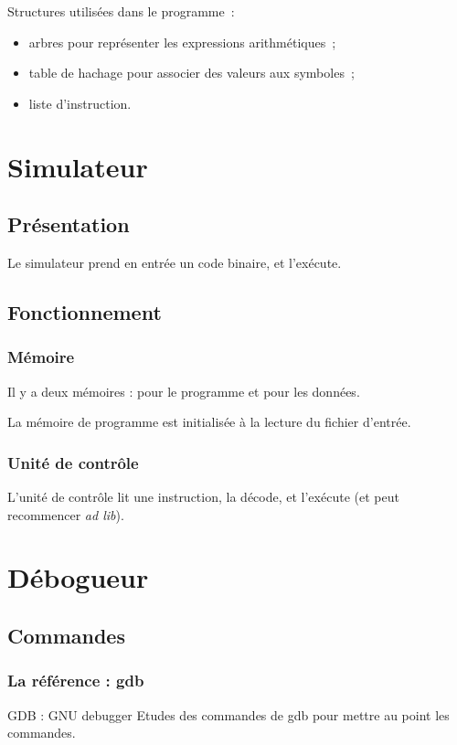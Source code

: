 \documentclass{beamer}
\begin{document}
\begin{frame}
Structures utilisées dans le programme~:
\begin{itemize}
\item arbres pour représenter les expressions arithmétiques~;
\item table de hachage pour associer des valeurs aux symboles~;
\item liste d'instruction.
\end{itemize}
\end{frame}

\section{Simulateur}
\subsection{Présentation}
\begin{frame}
Le simulateur prend en entrée un code binaire, et l'exécute.
\end{frame}

\subsection{Fonctionnement}
\begin{frame}
\frametitle{Mémoire}
	Il y a deux mémoires : pour le programme et pour les données.
	
	La mémoire de programme est initialisée à la lecture du fichier d'entrée.
\end{frame}

\begin{frame}
\frametitle{Unité de contrôle}
L'unité de contrôle lit une instruction, la décode, et l'exécute (et peut recommencer \emph{ad lib}).
\end{frame}

\section{Débogueur}

\subsection{Commandes}

\begin{frame}
	\frametitle{La référence : gdb}
	GDB : GNU debugger
	Etudes des commandes de gdb pour mettre au point les commandes.
\end{frame}
\end{document}
